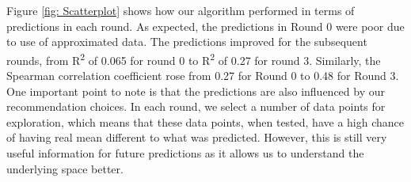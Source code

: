 \documentclass{article}
\begin{document}
Figure \ref{fig: Scatterplot} shows how our algorithm performed in terms of predictions in each round. 
As expected, the predictions in Round 0 were poor due to use of approximated data. 
The predictions improved for the subsequent rounds, from R\textsuperscript{2} of 0.065 for round 0 to R\textsuperscript{2} of 0.27 for round 3.
Similarly, the Spearman correlation coefficient rose from 0.27 for Round 0 to 0.48 for Round 3.
One important point to note is that the predictions are also influenced by our recommendation choices. 
In each round, we select a number of data points for exploration, which means that these data points, when tested, have a high chance of having real mean different to what was predicted.
However, this is still very useful information for future predictions as it allows us to understand the underlying space better.
    
\end{document}
